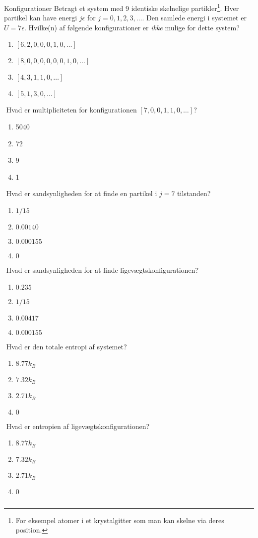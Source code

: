 \begin{opgave}{Konfigurationer}
    Betragt et system med 9 identiske skelnelige partikler\footnote{For eksempel atomer i et krystalgitter som man kan skelne via deres position.}. Hver partikel kan have energi $j\epsilon$ for $j=0,1,2,3,\dots$. Den samlede energi i systemet er $U=7\epsilon$.
    \opg Hvilke(n) af følgende konfigurationer er \emph{ikke} mulige for dette system?
    \begin{enumerate}[label=\alph*)]
        \item $[6,2,0,0,0,1,0,\dots]$
        \item $[8,0,0,0,0,0,0,1,0,\dots]$
        \item $[4,3,1,1,0,\dots]$
        \item $[5,1,3,0,\dots]$
    \end{enumerate}$ $
    \opg Hvad er multipliciteten for konfigurationen $[7,0,0,1,1,0,\dots]$?
    \begin{enumerate}[label=\alph*)]
        \item 5040
        \item 72
        \item 9
        \item 1
    \end{enumerate}$ $
    \opg Hvad er sandsynligheden for at finde en partikel i $j=7$ tilstanden?
    \begin{enumerate}[label=\alph*)]
        \item $1/15$
        \item $0.00140$
        \item $0.000155$
        \item $0$
    \end{enumerate}$ $
    \opg Hvad er sandsynligheden for at finde ligevægtskonfigurationen?
    \begin{enumerate}[label=\alph*)]
        \item $0.235$
        \item $1/15$
        \item $0.00417$
        \item $0.000155$
    \end{enumerate}$ $
    \opg Hvad er den totale entropi af systemet?
    \begin{enumerate}[label=\alph*)]
        \item $8.77k_B$
        \item $7.32k_B$
        \item $2.71k_B$
        \item $0$
    \end{enumerate}$ $
    \opg Hvad er entropien af ligevægtskonfigurationen?
    \begin{enumerate}[label=\alph*)]
        \item $8.77k_B$
        \item $7.32k_B$
        \item $2.71k_B$
        \item $0$
    \end{enumerate}$ $
\end{opgave}

